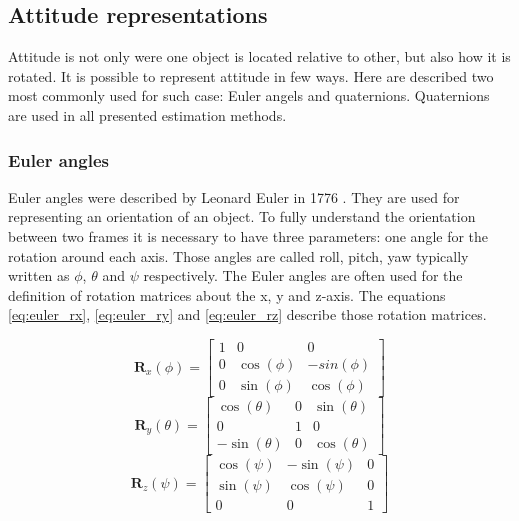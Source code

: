 \documentclass[12pt,a4paper,twoside]{article}
\begin{document}
\subsection{Attitude representations}
Attitude is not only were one object is located relative to other, but also how it is rotated. It is possible to represent attitude in few ways. Here are described two most commonly used for such case: Euler angels and quaternions. Quaternions are used in all presented estimation methods.

\subsubsection{Euler angles}

Euler angles were described by Leonard Euler in 1776 \cite{euler1775formulae}. They are used for representing an orientation of an object.
To fully understand the orientation between two frames it is necessary to have three parameters: one angle for the rotation around each axis. Those angles are called roll, pitch, yaw typically written as $\phi$, $\theta$ and $\psi$ respectively. The Euler angles are often used for the definition of rotation matrices about the x, y and z-axis. The equations \ref{eq:euler_rx}, \ref{eq:euler_ry} and \ref{eq:euler_rz} describe those rotation matrices.

\begin{equation} \label{eq:euler_rx}
\bm{R}_x(\phi) = \begin{bmatrix}
1 & 0 & 0 \\
0 & \cos(\phi) & -sin(\phi) \\
0 & \sin(\phi) & \cos(\phi)
\end{bmatrix}
\end{equation}
\begin{equation} \label{eq:euler_ry}
\bm{R}_y(\theta) = \begin{bmatrix}
\cos(\theta) & 0 & \sin(\theta) \\
0 & 1 & 0 \\
-\sin(\theta) & 0 & \cos(\theta)
\end{bmatrix}
\end{equation}
\begin{equation} \label{eq:euler_rz}
\bm{R}_z(\psi) = \begin{bmatrix}
\cos(\psi) & -\sin(\psi) & 0 \\
\sin(\psi) & \cos(\psi) & 0 \\
0 & 0 & 1
\end{bmatrix}
\end{equation}
\end{document}
